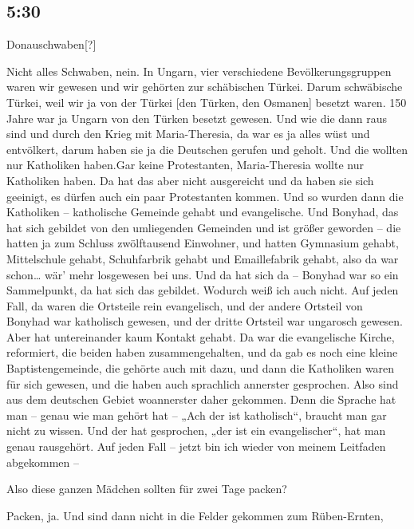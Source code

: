 \documentclass[ngerman,]{article}
\providecommand{\tightlist}{%
  \setlength{\itemsep}{0pt}\setlength{\parskip}{0pt}}
\begin{document}
\begin{multicols}{2}
\hypertarget{section-4}{%
\subsection{5:30}\label{section-4}}

\begin{description}
\tightlist
\item[Ruth]
Donauschwaben{[}?{]}
\item[Käthe]
Nicht alles Schwaben, nein. In Ungarn, vier verschiedene
Bevölkerungsgruppen waren wir gewesen und wir gehörten zur schäbischen
Türkei. Darum schwäbische Türkei, weil wir ja von der Türkei {[}den
Türken, den Osmanen{]} besetzt waren. 150 Jahre war ja Ungarn von den
Türken besetzt gewesen. Und wie die dann raus sind und durch den Krieg
mit Maria-Theresia, da war es ja alles wüst und entvölkert, darum haben
sie ja die Deutschen gerufen und geholt. Und die wollten nur Katholiken
haben.Gar keine Protestanten, Maria-Theresia wollte nur Katholiken
haben. Da hat das aber nicht ausgereicht und da haben sie sich geeinigt,
es dürfen auch ein paar Protestanten kommen. Und so wurden dann die
Katholiken – katholische Gemeinde gehabt und evangelische. Und Bonyhad,
das hat sich gebildet von den umliegenden Gemeinden und ist größer
geworden – die hatten ja zum Schluss zwölftausend Einwohner, und hatten
Gymnasium gehabt, Mittelschule gehabt, Schuhfarbrik gehabt und
Emaillefabrik gehabt, also da war schon\ldots{} wär' mehr losgewesen bei
uns. Und da hat sich da – Bonyhad war so ein Sammelpunkt, da hat sich
das gebildet. Wodurch weiß ich auch nicht. Auf jeden Fall, da waren die
Ortsteile rein evangelisch, und der andere Ortsteil von Bonyhad war
katholisch gewesen, und der dritte Ortsteil war ungarosch gewesen. Aber
hat untereinander kaum Kontakt gehabt. Da war die evangelische Kirche,
reformiert, die beiden haben zusammengehalten, und da gab es noch eine
kleine Baptistengemeinde, die gehörte auch mit dazu, und dann die
Katholiken waren für sich gewesen, und die haben auch sprachlich
annerster gesprochen. Also sind aus dem deutschen Gebiet woannerster
daher gekommen. Denn die Sprache hat man – genau wie man gehört hat –
„Ach der ist katholisch“, braucht man gar nicht zu wissen. Und der hat
gesprochen, „der ist ein evangelischer“, hat man genau rausgehört. Auf
jeden Fall – jetzt bin ich wieder von meinem Leitfaden abgekommen –
\item[Ruth]
Also diese ganzen Mädchen sollten für zwei Tage packen?
\item[Käthe]
Packen, ja. Und sind dann nicht in die Felder gekommen zum Rüben-Ernten,

\end{description}
\end{multicols}
\end{document}
